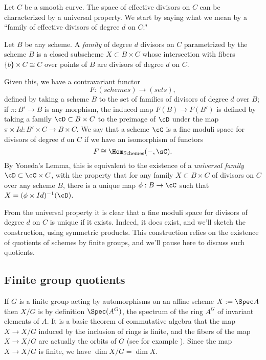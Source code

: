 Let $C$ be a smooth curve. The space of effective divisors on $C$ can be characterized by a universal property. We start by saying what we mean by a ``family of effective divisors of degree $d$ on $C$:"

\begin{definition}
Let $B$ be any scheme. A \emph{family} of degree $d$ divisors on $C$ parametrized by the scheme $B$ is a closed subscheme $X\subset B\times C$ whose intersection with fibers $\{b\} \times C \cong C$ over points of $B$ are divisors of degree $d$ on $C$.
\end{definition}

Given this, we have a contravariant functor 
$$
F : (schemes) \to (sets),
$$
defined by taking a scheme $B$ to the set of families of divisors of degree $d$ over $B$; if $\pi : B' \to B$ is any morphism, the induced map $F(B) \to F(B')$ is defined by taking a family $\cD \subset B \times C$ to the preimage of $\cD$ under the map $\pi \times Id : B' \times C \to B \times C$. We say that a scheme $\cC$ is a fine moduli space for divisors of degree $d$ on $C$ if we have an isomorphism of functors
$$
F \cong \Hom_{\rm{Schemes}}( -, \sC).
$$
By Yoneda's Lemma, this is equivalent to the existence of a \emph{universal family} $\cD \subset \cC \times C$, with the property that for any family $X \subset B \times C$ of divisors on $C$ over any scheme $B$, there is a unique map $\phi : B \to \cC$ such that $X = (\phi \times Id)^{-1}(\cD)$.

From the universal property it is clear that a fine moduli space for divisors of degree $d$ on $C$ is unique if it exists. Indeed, it does exist, and we'll sketch the construction, using symmetric products. This construction relies on the existence of quotients of schemes by finite groups, and we'll pause here to discuss such quotients.

\subsection{Finite group quotients}

If $G$ is a finite group acting by automorphisms on an affine scheme $X:=\Spec A$ then $X/G$ is by definition $\Spec(A^G)$, the spectrum of the ring $A^G$ of invariant elements of $A$. It is a basic theorem of commutative algebra that the map $X\to X/G$ induced by the inclusion of rings is finite, and the fibers of the map $X\to X/G$ are actually the orbits of $G$ (see for example \cite[Proposition 13.10]{Eisenbud1995}).  Since the map $X\to X/G$ is finite, we have $\dim X/G = \dim X$. 

